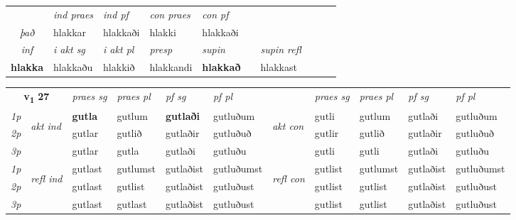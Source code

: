 \begin{tabular}{lllllllllll}
   & &  \textit{ind praes} & \textit{ind pf} & \textit{con praes} & \textit{con pf} \\*
\multicolumn{2}{c}{ \textit{það} } & hlakkar & hlakkaði & hlakki & hlakkaði \\*

\cmidrule{3-8}
   \multicolumn{2}{c}{\textit{inf}}  & \textit{i akt sg} & \textit{i akt pl}   & \textit{presp} & \textit{supin} && \textit{supin refl}  \\*
  \multicolumn{2}{c}{\textbf{hlakka}} & hlakkaðu  & hlakkið   & hlakkandi &  \textbf{hlakkað} && hlakkast  \\*
\end{tabular}

\noindent
\begin{tabular}{lllllllllll} \toprule
\multicolumn{2}{c}{\textbf{v{\textsubscript{1}}} \Large{\textbf{27}}}  &  \textit{praes sg}  & \textit{praes pl}  &\textit{ pf sg} & \textit{pf pl} &  &  \textit{praes sg}  & \textit{praes pl}  & \textit{pf sg} & \textit{pf pl } \\*
	\cmidrule{3-6} \cmidrule{8-11}
 {\textit{1p}} & \multirow{3}{*}{\begin{turn}{90}\textit{akt ind}\end{turn}} & \textbf{gutla} & gutlum & \textbf{gutlaði} & gutluðum & \multirow{3}{*}{\begin{turn}{90}\textit{akt con}\end{turn}} &gutli & gutlum & gutlaði & gutluðum\\*
 {\textit{2p}} &  &  gutlar  & gutlið & gutlaðir & gutluðuð & & gutlir & gutlið & gutlaðir & gutluðuð \\*
{\textit{3p}} &  & gutlar & gutla & gutlaði & gutluðu & & gutli & gutli& gutlaði & gutluðu \\*
\cmidrule{3-6} \cmidrule{8-11}
 {\textit{1p}} & \multirow{3}{*}{\begin{turn}{90}\textit{refl ind}\end{turn}}  & gutlast & gutlumst & gutlaðist & gutluðumst & \multirow{3}{*}{\begin{turn}{90}\textit{refl con}\end{turn}}  &gutlist & gutlumst & gutlaðist & gutluðumst \\*
 {\textit{2p}} &  & gutlast & gutlist & gutlaðist & gutluðust & &gutlist & gutlist & gutlaðist & gutluðust \\*
 {\textit{3p}}  & & gutlast & gutlast & gutlaðist & gutluðust & & gutlist & gutlist& gutlaðist & gutluðust \\*
\cmidrule{3-6} \cmidrule{8-11}


\end{tabular}
